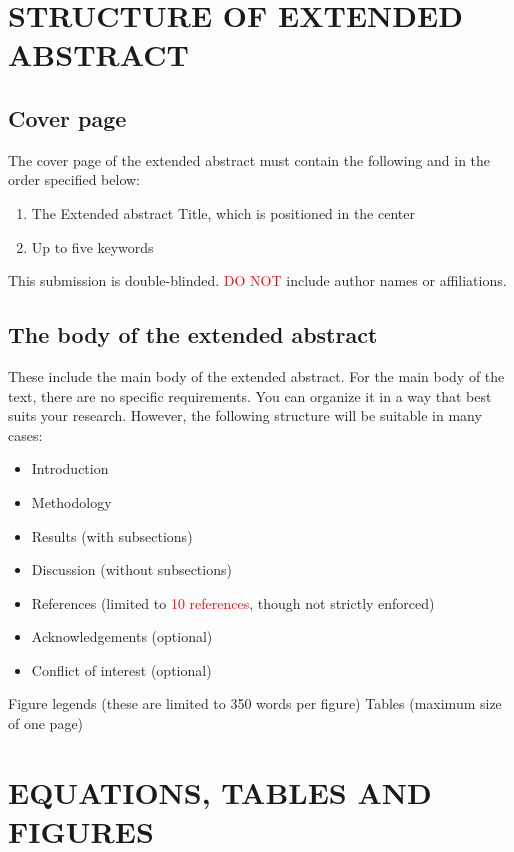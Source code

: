 \documentclass[a4paper,twoside,11pt]{article}
\begin{document}
\section{ STRUCTURE OF EXTENDED ABSTRACT}

\subsection{Cover page}

The cover page of the extended abstract must contain the following and in the order specified below:

\begin{enumerate}
\item  The Extended abstract Title, which is positioned in the center

\item  Up to five keywords

\end{enumerate}

This submission is double-blinded. \textcolor{red}{DO NOT} include author names or affiliations.

\subsection{The body of the extended abstract}
These include the main body of the extended abstract. For the main body of the text, there are no specific requirements. You can organize it in a way that best suits your research. However, the following structure will be suitable in many cases:
\begin{itemize}
    \item Introduction
    \item Methodology
    \item Results (with subsections)
    \item Discussion (without subsections)
    \item References (limited to \textcolor{red}{10 references}, though not strictly enforced)
    \item Acknowledgements (optional)
    \item Conflict of interest (optional)
\end{itemize}
  
\noindent Figure legends (these are limited to 350 words per figure)
Tables (maximum size of one page)

\section{ EQUATIONS, TABLES AND FIGURES}
\end{document}
